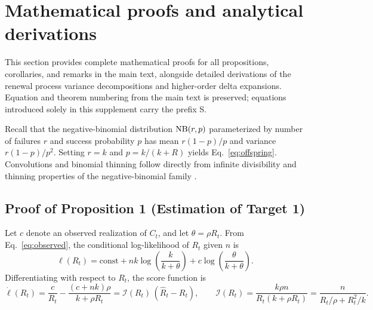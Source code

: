 \section{Mathematical proofs and analytical derivations}
\label{app:proofs}

This section provides complete mathematical proofs for all propositions, corollaries, and remarks in the main text, alongside detailed derivations of the renewal process variance decompositions and higher-order delta expansions. Equation and theorem numbering from the main text is preserved; equations introduced solely in this supplement carry the prefix S.

Recall that the negative-binomial distribution $\mathrm{NB}(r, p)$ parameterized by number of failures $r$ and success probability $p$ has mean $r(1-p)/p$ and variance $r(1-p)/p^2$. Setting $r = k$ and $p = k/(k + R)$ yields Eq.~\eqref{eq:offspring}. Convolutions and binomial thinning follow directly from infinite divisibility and thinning properties of the negative-binomial family \citep{casella2002statistical}.

\subsection{Proof of Proposition 1 (Estimation of Target 1)}
\label{sec:proof-prop1}

Let $c$ denote an observed realization of $C_t$, and let $\theta = \rho R_t$. From Eq.~\eqref{eq:observed}, the conditional log-likelihood of $R_t$ given $n$ is
\begin{equation}
  \ell(R_t) = \text{const} + nk\log\left(\frac{k}{k+\theta}\right) + c\log\left(\frac{\theta}{k+\theta}\right).
\end{equation}
Differentiating with respect to $R_t$, the score function is
\begin{equation}
  \dot{\ell}(R_t) = \frac{c}{R_t} - \frac{(c+nk)\rho}{k+\rho R_t}
  = \mathcal{I}(R_t)\,(\widehat{R}_t - R_t), \qquad
  \mathcal{I}(R_t) = \frac{k\rho n}{R_t(k+\rho R_t)} = \frac{n}{R_t/\rho + R_t^2/k}.
  \label{eq:score}
\end{equation}


